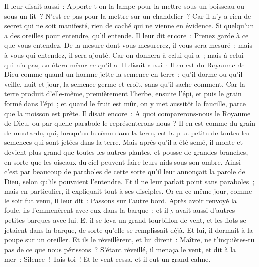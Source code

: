 \begin{multicols}{2}
Il leur disait aussi~: Apporte-t-on la lampe pour la mettre sous un boisseau ou sous un lit~? N'est-ce pas pour la mettre sur un chandelier~?
Car il n'y a rien de secret qui ne soit manifesté, rien de caché qui ne vienne en évidence.
Si quelqu'un a des oreilles pour entendre, qu'il entende.
Il leur dit encore~: Prenez garde à ce que vous entendez. De la mesure dont vous mesurerez, il vous sera mesuré~; mais à vous qui entendez, il sera ajouté.
Car on donnera à celui qui a~; mais à celui qui n'a pas, on ôtera même ce qu'il a.
Il disait aussi~: Il en est du Royaume de Dieu comme quand un homme jette la semence en terre~;
qu'il dorme ou qu'il veille, nuit et jour, la semence germe et croit, sans qu'il sache comment.
Car la terre produit d'elle-même, premièrement l'herbe, ensuite l'épi, et puis le grain formé dans l'épi~;
et quand le fruit est mûr, on y met aussitôt la faucille, parce que la moisson est prête.
Il disait encore~: A quoi comparerons-nous le Royaume de Dieu, ou par quelle parabole le représenterons-nous~?
Il en est comme du grain de moutarde, qui, lorsqu'on le sème dans la terre, est la plus petite de toutes les semences qui sont jetées dans la terre.
Mais après qu'il a été semé, il monte et devient plus grand que toutes les autres plantes, et pousse de grandes branches, en sorte que les oiseaux du ciel peuvent faire leurs nids sous son ombre.
Ainsi c'est par beaucoup de paraboles de cette sorte qu'il leur annonçait la parole de Dieu, selon qu'ils pouvaient l'entendre.
Et il ne leur parlait point sans paraboles~; mais en particulier, il expliquait tout à ses disciples.
Or en ce même jour, comme le soir fut venu, il leur dit~: Passons sur l'autre bord.
Après avoir renvoyé la foule, ils l'emmenèrent avec eux dans la barque~; et il y avait aussi d'autres petites barques avec lui.
Et il se leva un grand tourbillon de vent, et les flots se jetaient dans la barque, de sorte qu'elle se remplissait déjà.
Et lui, il dormait à la poupe sur un oreiller. Et ils le réveillèrent, et lui dirent~: Maître, ne t'inquiètes-tu pas de ce que nous périssons~?
S'étant réveillé, il menaça le vent, et dit à la mer~: Silence~! Tais-toi~! Et le vent cessa, et il eut un grand calme.

\end{multicols}
